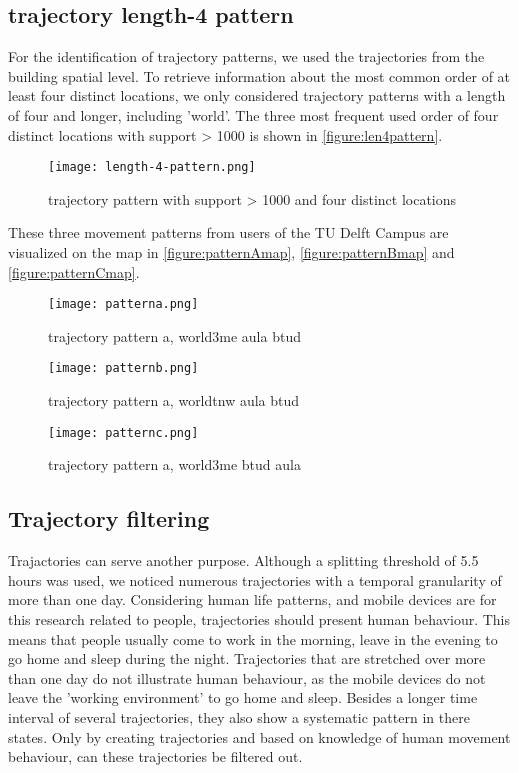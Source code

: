 \subsection{trajectory length-4 pattern}
For the identification of trajectory patterns, we used the trajectories from the building spatial level. To retrieve information about the most common order of at least four distinct locations, we only considered trajectory patterns with a length of four and longer, including 'world'. The three most frequent used order of four distinct locations with support > 1000 is shown in \autoref{figure:len4pattern}.

\begin{figure}[H]
\centering
\texttt{[image: length-4-pattern.png]}
\captionsetup{justification=centering}
\caption{trajectory pattern with support > 1000 and four distinct locations}
\label{figure:len4pattern}
\end{figure}

These three movement patterns from users of the TU Delft Campus are visualized on the map in \autoref{figure:patternAmap}, \autoref{figure:patternBmap} and \autoref{figure:patternCmap}.

\begin{figure}[H]
\centering
\texttt{[image: patterna.png]}
\captionsetup{justification=centering}
\caption{trajectory pattern a, world\rightarrow 3me \rightarrow aula \rightarrow btud}
\label{figure:patternAmap}
\end{figure}

\begin{figure}[H]
\centering
\texttt{[image: patternb.png]}
\captionsetup{justification=centering}
\caption{trajectory pattern a, world\rightarrow tnw \rightarrow aula \rightarrow btud}
\label{figure:patternBmap}
\end{figure}

\begin{figure}[H]
\centering
\texttt{[image: patternc.png]}
\captionsetup{justification=centering}
\caption{trajectory pattern a, world\rightarrow 3me \rightarrow btud \rightarrow aula}
\label{figure:patternCmap}
\end{figure}

\subsection{Trajectory filtering}
Trajactories can serve another purpose. Although a splitting threshold of 5.5 hours was used, we noticed numerous trajectories with a temporal granularity of more than one day. Considering human life patterns, and mobile devices are for this research related to people, trajectories should present human behaviour. This means that people usually come to work in the morning, leave in the evening to go home and sleep during the night. Trajectories that are stretched over more than one day do not illustrate human behaviour, as the mobile devices do not leave the 'working environment' to go home and sleep. Besides a longer time interval of several trajectories, they also show a systematic pattern in there states. Only by creating trajectories and based on knowledge of human movement behaviour, can these trajectories be filtered out. 
